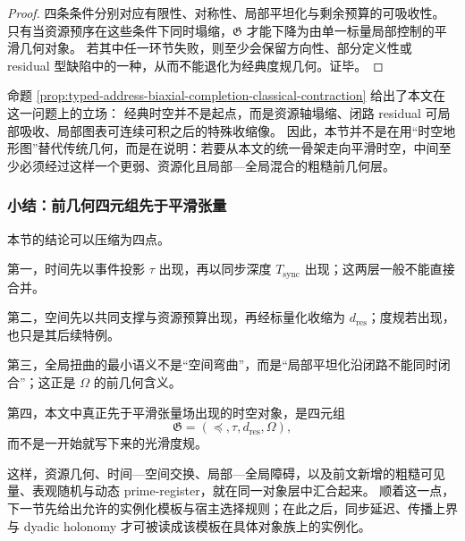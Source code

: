 \begin{proof}
四条条件分别对应有限性、对称性、局部平坦化与剩余预算的可吸收性。
只有当资源预序在这些条件下同时塌缩，\(\mathfrak G\) 才能下降为由单一标量局部控制的平滑几何对象。
若其中任一环节失败，则至少会保留方向性、部分定义性或 residual 型缺陷中的一种，从而不能退化为经典度规几何。证毕。
\end{proof}

命题 \ref{prop:typed-address-biaxial-completion-classical-contraction} 给出了本文在这一问题上的立场：
经典时空并不是起点，而是资源轴塌缩、闭路 residual 可局部吸收、局部图表可连续可积之后的特殊收缩像。
因此，本节并不是在用“时空地形图”替代传统几何，而是在说明：若要从本文的统一骨架走向平滑时空，中间至少必须经过这样一个更弱、资源化且局部—全局混合的粗糙前几何层。

\subsubsection{小结：前几何四元组先于平滑张量}\label{subsubsec:typed-address-biaxial-completion-rough-spacetime-summary}
本节的结论可以压缩为四点。

第一，时间先以事件投影 \(\tau\) 出现，再以同步深度 \(T_{\mathrm{sync}}\) 出现；这两层一般不能直接合并。

第二，空间先以共同支撑与资源预算出现，再经标量化收缩为 \(d_{\mathrm{res}}\)；度规若出现，也只是其后续特例。

第三，全局扭曲的最小语义不是“空间弯曲”，而是“局部平坦化沿闭路不能同时闭合”；这正是 \(\Omega\) 的前几何含义。

第四，本文中真正先于平滑张量场出现的时空对象，是四元组
\[
\mathfrak G=(\preceq,\tau,d_{\mathrm{res}},\Omega),
\]
而不是一开始就写下来的光滑度规。

这样，资源几何、时间—空间交换、局部—全局障碍，以及前文新增的粗糙可见量、表观随机与动态 prime-register，就在同一对象层中汇合起来。
顺着这一点，下一节先给出允许的实例化模板与宿主选择规则；在此之后，同步延迟、传播上界与 dyadic holonomy 才可被读成该模板在具体对象族上的实例化。
